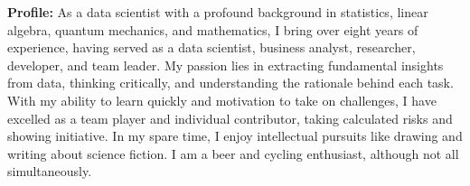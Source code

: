 
\vspace*{-2mm}
\begin{tcolorbox}[
        width=\textwidth,
        colback={gray!30},
        colframe=white,
        sharp corners,
        boxrule=0mm,
        arc=1mm,
    ]
    \begin{spacing}{1.2}
        \begin{multicols}{2}
            {\bf\large Profile:}
            As a data scientist with a profound background in statistics, linear algebra, quantum mechanics, and mathematics, I bring over eight years of experience, having served as a data scientist, business analyst, researcher, developer, and team leader. My passion lies in extracting fundamental insights from data, thinking critically, and understanding the rationale behind each task. With my ability to learn quickly and motivation to take on challenges, I have excelled as a team player and individual contributor, taking calculated risks and showing initiative.
            In my spare time, I enjoy intellectual pursuits like drawing and writing about science fiction. I am a beer and cycling enthusiast, although not all simultaneously.

        \end{multicols}
    \end{spacing}
    \vspace*{-4mm}

\end{tcolorbox}
\vspace*{-6mm}